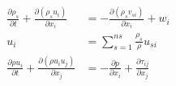 \documentclass[12pt,fleqn,preview,varwidth,border={0mm 1mm 0mm 0mm}]{standalone}
\begin{document}
{%
\setlength{\mathindent}{0pt}
\begin{varwidth}{.75\linewidth}
    \begin{align*}
        \frac{\partial\rho_s}{\partial t} + \frac{\partial(\rho_su_i)}{\partial x_i}      & = -\frac{\partial(\rho_sv_{si})}{\partial x_i} + w_i                         \\
        u_i                                                                               & = \sum^{ns}_{s=1}\frac{\rho_s}{\rho}u_{si}                                   \\
        \frac{\partial\rho u_i}{\partial t} + \frac{\partial(\rho u_i u_j)}{\partial x_j} & = -\frac{\partial p}{\partial x_i} + \frac{\partial \tau_{ij}}{\partial x_j}
    \end{align*}
\end{varwidth}
}
\end{document}
